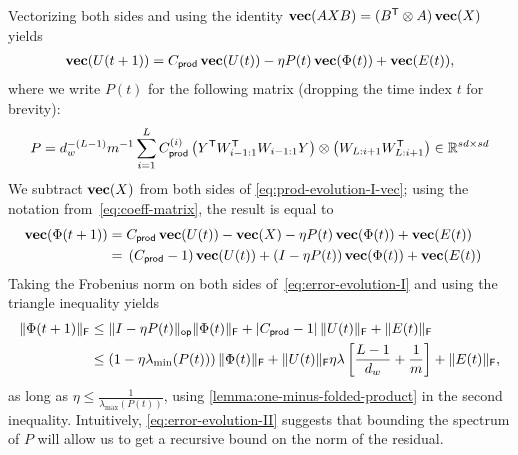 Vectorizing both sides and using the identity $\operatorname{\mathbf{vec}}(AXB) = (B^{\mathsf{T}} \otimes A) \operatorname{\mathbf{vec}}(X)$ yields
\begin{align}
	\operatorname{\mathbf{vec}} (U(t+1))
	= C_{\mathsf{prod}} \operatorname{\mathbf{vec}} (U(t))
	-\eta P(t) \operatorname{\mathbf{vec}}(\Phi(t))
	+ \operatorname{\mathbf{vec}}(E(t)),
	\label{eq:prod-evolution-I-vec}
\end{align}
where we write $P(t)$ for the following matrix (dropping the
time index $t$ for brevity):
\begin{align}
	P
	= d_w^{-(L-1)}m^{-1}
	\sum_{i=1}^L
	C_{\mathsf{prod}}^{({i})}
	\left(Y^{\mathsf{T}} W_{i-1:1}^{\mathsf{T}} W_{i-1:1}Y \right)
	\otimes
	\left(W_{L:i+1} W_{L:i+1}^{\mathsf{T}}\right)
    \in \mathbb{R}^{sd \times sd}
	\label{eq:coeff-matrix}
\end{align}
We subtract $\operatorname{\mathbf{vec}}(X)$ from both sides of
\cref{eq:prod-evolution-I-vec}; using the notation from~\cref{eq:coeff-matrix}, the result is equal to
\begin{align}
    \notag
	\operatorname{\mathbf{vec}}(\Phi(t+1))
	 & =
	\begin{aligned}[t]
		 & C_{\mathsf{prod}} \operatorname{\mathbf{vec}} (U(t))
		- \operatorname{\mathbf{vec}}(X)
		-\eta P(t) \operatorname{\mathbf{vec}}(\Phi(t))
		+ \operatorname{\mathbf{vec}}(E(t))
	\end{aligned} \\
	 & =
	\begin{aligned}[t]
		 & \left(C_{\mathsf{prod}} - 1\right) \operatorname{\mathbf{vec}} (U(t))
		+ (I-\eta P(t)) \operatorname{\mathbf{vec}}(\Phi(t))
		+ \operatorname{\mathbf{vec}}(E(t))
	\end{aligned}
	\label{eq:error-evolution-I}
\end{align}
Taking the Frobenius norm on both sides of~\eqref{eq:error-evolution-I}
and using the triangle inequality yields
\begin{align}
    \notag
	\lVert\Phi(t+1)\rVert_{\mathsf{F}}
	 & \leq
	\lVert I - \eta P(t)\rVert_{\mathsf{op}} \lVert\Phi(t)\rVert_{\mathsf{F}}
	+ \left|C_{\mathsf{prod}}-1\right| \lVert U(t)\rVert_{\mathsf{F}}
	+ \lVert E(t)\rVert_{\mathsf{F}} \\
	 & \leq
	\left(1 - \eta \lambda_{\min}(P(t))\right)
	\lVert\Phi(t)\rVert_{\mathsf{F}}
	+ \lVert U(t)\rVert_{\mathsf{F}} \eta \lambda \left[ \frac{L - 1}{d_w} + \frac{1}{m} \right]
	+ \lVert E(t)\rVert_{\mathsf{F}},
	\label{eq:error-evolution-II}
\end{align}
as long as $\eta \le \frac{1}{\lambda_{\max}(P(t))}$, using
\cref{lemma:one-minus-folded-product} in the second inequality.
Intuitively, \cref{eq:error-evolution-II} suggests that
bounding the spectrum of $P$ will allow us to get a recursive bound on the norm of the residual.


